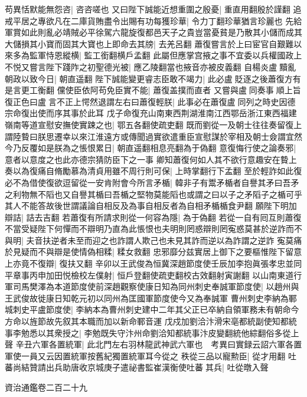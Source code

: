 苟異恬默能無怨咨|{
	咨咨嗟也}
又曰陛下誠能近想重圍之殷憂|{
	重直用翻殷於謹翻}
追戒平居之專欲凡在二庫貨賄盡令出賜有功每獲珍華|{
	令力丁翻珍華猶言珍麗也}
先給軍賞如此則亂必靖賊必平徐駕六龍旋復都邑天子之貴豈當憂貧是乃散其小儲而成其大儲損其小寶而固其大寶也上即命去其牓|{
	去羌呂翻}
蕭復嘗言於上曰宦官自艱難以來多為監軍恃恩縱横|{
	監工銜翻横戶孟翻}
此屬但應掌宫掖之事不宜委以兵權國政上不悦又嘗言陛下踐阼之初聖德光被|{
	應乙陵翻當也掖音亦被皮義翻}
自楊炎盧黷亂朝政以致今日|{
	朝直遥翻}
陛下誠能變更睿志臣敢不竭力|{
	此必盧貶逐之後蕭復方有是言更工衡翻}
儻使臣依阿苟免臣實不能|{
	蕭復盖撲而直者}
又嘗與盧同奏事順上旨復正色曰盧言不正上愕然退謂左右曰蕭復輕朕|{
	此事必在蕭復盧同列之時史因德宗命復出使而序其事於此耳}
戊子命復充山南東西荆湖淮南江西鄂岳浙江東西福建嶺南等道宣慰安撫使實踈之也|{
	鄂五各翻使疏吏翻}
既而劉從一及朝士往往奏留復上謂陸䞇曰朕思遷幸以來江淮遠方或傳聞過實欲遣重臣宣慰謀於宰相及朝士僉謂宜然今乃反覆如是朕為之悵恨累日|{
	朝直遥翻相息亮翻為于偽翻}
意復悔行使之論奏邪|{
	意者以意度之也此亦德宗猜防臣下之一事}
卿知蕭復何如人其不欲行意趣安在䞇上奏以為復痛自脩勵慕為清貞用雖不周行則可保|{
	上時掌翻行下孟翻}
至於輕詐如此復必不為借使復欲逗留從一安肯附會今所言矛楯|{
	韓非子有鬻矛楯者自譽其矛曰吾矛之利物無不䧟也又自譽其楯曰吾楯之堅物莫能䧟也或謂之曰以子之矛䧟子之楯可乎其人不能答故後世謂議論自相反及為事自相反者為自相矛楯楯食尹翻}
願陛下明加辯詰|{
	詰去吉翻}
若蕭復有所請求則從一何容為隱|{
	為于偽翻}
若從一自有囘互則蕭復不當受疑陛下何憚而不辯明乃直為此悵恨也夫明則罔惑辯則罔寃惑莫甚於逆詐而不與明|{
	夫音扶逆者未至而迎之也詐謂人欺己也未見其詐而逆以為詐謂之逆詐}
寃莫痛於見疑而不與辯是使情偽相糅|{
	糅女救翻}
忠邪靡分兹實居上御下之要樞惟陛下留意上亦竟不復辯|{
	復扶又翻}
辛卯以王武俊為恒冀深趙節度使壬辰加李抱眞張孝忠並同平章事丙申加田悦檢校左僕射|{
	恒戶登翻使疏吏翻校古效翻射寅謝翻}
以山南東道行軍司馬樊澤為本道節度使前深趙觀察使康日知為同州刺史奉誠軍節度使|{
	以趙州與王武俊故徙康日知乾元初以同州為匡國軍節度使今又為奉誠軍}
曹州刺史李納為鄆城刺史平盧節度使|{
	李納本為曹州刺史建中二年其父正已卒納自領軍務未有朝命今方命以旌節故先叙其本職而加以新命鄆音運}
戊戍加劉洽汴滑宋亳都統副使知都統事李勉悉以其衆授之|{
	李勉既失守汴州命劉洽知都統事汴皮變翻統他綜翻俗多從上聲}
辛丑六軍各置統軍|{
	此北門左右羽林龍武神武六軍也　考異曰實録云詔六軍各置軍使一員又云因置統軍按舊紀獨置統軍耳今從之}
秩從三品以寵勲臣|{
	從才用翻}
吐蕃尚結贊請出兵助唐收京城庚子遣祕書監崔漢衡使吐蕃其兵|{
	吐從暾入聲}


資治通鑑卷二百二十九
